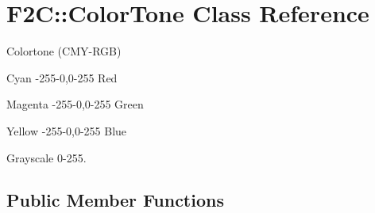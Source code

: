 \hypertarget{class_f2_c_1_1_color_tone}{
\section{F2C::ColorTone Class Reference}
\label{class_f2_c_1_1_color_tone}
}


Colortone (CMY-\/RGB) \par
 Cyan -\/255-\/0,0-\/255 Red \par
 Magenta -\/255-\/0,0-\/255 Green \par
 Yellow -\/255-\/0,0-\/255 Blue \par
 Grayscale 0-\/255.  
\subsection*{Public Member Functions}
